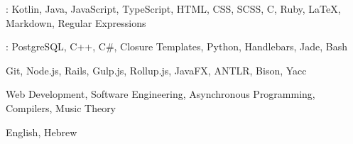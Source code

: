 
\begin{cvparagraph}
    : Kotlin, Java, JavaScript, TypeScript, HTML, CSS, SCSS, C, Ruby, LaTeX, Markdown, Regular Expressions

    : PostgreSQL, C++, C\#, Closure Templates, Python, Handlebars, Jade, Bash

     Git, Node.js, Rails, Gulp.js, Rollup.js, JavaFX, ANTLR, Bison, Yacc

     Web Development, Software Engineering, Asynchronous Programming, Compilers, Music Theory

     English, Hebrew
\end{cvparagraph}
